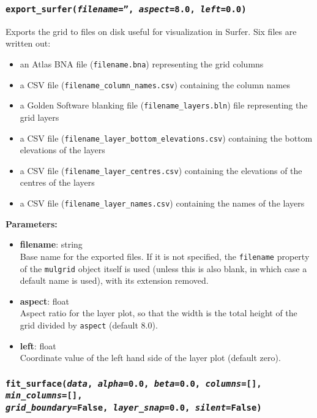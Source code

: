 \begin{snugshade}\subsubsection{\texttt{export\_surfer(\emph{filename}='', \emph{aspect}=8.0, \emph{left}=0.0)}}\end{snugshade}
\label{sec:mulgrid:export_surfer}

Exports the grid to files on disk useful for visualization in Surfer.  Six files are written out:

\begin{itemize}
\item an Atlas BNA file (\texttt{filename.bna}) representing the grid columns
\item a CSV file (\texttt{filename\_column\_names.csv}) containing the column names
\item a Golden Software blanking file (\texttt{filename\_layers.bln}) file representing the grid layers
\item a CSV file (\texttt{filename\_layer\_bottom\_elevations.csv}) containing the bottom elevations of the layers
\item a CSV file (\texttt{filename\_layer\_centres.csv}) containing the elevations of the centres of the layers
\item a CSV file (\texttt{filename\_layer\_names.csv}) containing the names of the layers
\end{itemize}

\textbf{Parameters:}
\begin{itemize}
\item \textbf{filename}: string\\
  Base name for the exported files.  If it is not specified, the \texttt{filename} property of the \texttt{mulgrid} object itself is used (unless this is also blank, in which case a default name is used), with its extension removed.
\item \textbf{aspect}: float\\
  Aspect ratio for the layer plot, so that the width is the total height of the grid divided by \texttt{aspect} (default 8.0).
\item \textbf{left}: float\\
  Coordinate value of the left hand side of the layer plot (default zero).
\end{itemize}

\begin{snugshade}\subsubsection{\texttt{fit\_surface(\emph{data}, \emph{alpha}=0.0, \emph{beta}=0.0, \emph{columns}=[], \emph{min\_columns}=[], \\
    \emph{grid\_boundary}=False, \emph{layer\_snap}=0.0, \emph{silent}=False)}}\end{snugshade}
\label{sec:mulgrid:fit_surface}

